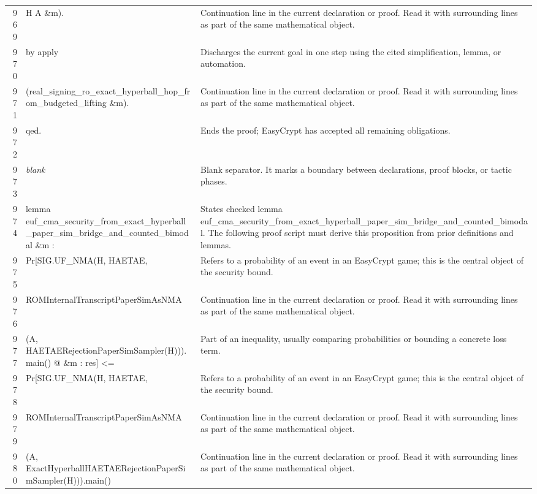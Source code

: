 \documentclass[10pt]{article}
\begin{document}
\begin{longtable}{r L{0.53\textwidth} L{0.37\textwidth}}
969 & {\ttfamily\scriptsize             H A \&m).} & Continuation line in the current declaration or proof.  Read it with surrounding lines as part of the same mathematical object. \\
970 & {\ttfamily\scriptsize by apply} & Discharges the current goal in one step using the cited simplification, lemma, or automation. \\
971 & {\ttfamily\scriptsize   (real\_signing\_ro\_exact\_hyperball\_hop\_from\_budgeted\_lifting \&m).} & Continuation line in the current declaration or proof.  Read it with surrounding lines as part of the same mathematical object. \\
972 & {\ttfamily\scriptsize qed.} & Ends the proof; EasyCrypt has accepted all remaining obligations. \\
973 & {\ttfamily\scriptsize \emph{blank}} & Blank separator.  It marks a boundary between declarations, proof blocks, or tactic phases. \\
974 & {\ttfamily\scriptsize lemma euf\_cma\_security\_from\_exact\_hyperball\_paper\_sim\_bridge\_and\_counted\_bimodal \&m :} & States checked lemma euf\_cma\_security\_from\_exact\_hyperball\_paper\_sim\_bridge\_and\_counted\_bimodal.  The following proof script must derive this proposition from prior definitions and lemmas. \\
975 & {\ttfamily\scriptsize   Pr[SIG.UF\_NMA(H, HAETAE,} & Refers to a probability of an event in an EasyCrypt game; this is the central object of the security bound. \\
976 & {\ttfamily\scriptsize        ROMInternalTranscriptPaperSimAsNMA} & Continuation line in the current declaration or proof.  Read it with surrounding lines as part of the same mathematical object. \\
977 & {\ttfamily\scriptsize          (A, HAETAERejectionPaperSimSampler(H))).main() @ \&m : res] <=} & Part of an inequality, usually comparing probabilities or bounding a concrete loss term. \\
978 & {\ttfamily\scriptsize   Pr[SIG.UF\_NMA(H, HAETAE,} & Refers to a probability of an event in an EasyCrypt game; this is the central object of the security bound. \\
979 & {\ttfamily\scriptsize        ROMInternalTranscriptPaperSimAsNMA} & Continuation line in the current declaration or proof.  Read it with surrounding lines as part of the same mathematical object. \\
980 & {\ttfamily\scriptsize          (A, ExactHyperballHAETAERejectionPaperSimSampler(H))).main()} & Continuation line in the current declaration or proof.  Read it with surrounding lines as part of the same mathematical object. \\

\end{longtable}
\end{document}

